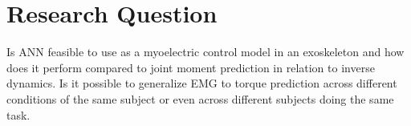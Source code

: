 \documentclass[../main.tex]{subfiles}
\begin{document}

\section{Research Question}
Is \ac{ANN} feasible to use as a myoelectric control model in an exoskeleton and how does it perform compared to joint moment prediction in relation to inverse dynamics. 
Is it possible to generalize \ac{EMG} to torque prediction across different conditions of the same subject or even across different subjects doing the same task.
\end{document}
